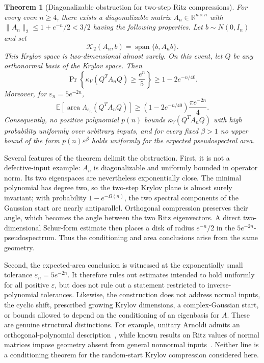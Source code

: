 \documentclass[11pt]{article}
\newtheorem{theorem}{Theorem}[section]
\begin{document}
\begin{theorem}[Diagonalizable obstruction for two-step Ritz compressions]
\label{thm:main}
For every even $n\geq4$, there exists a diagonalizable matrix
$A_n\in\mathbb R^{n\times n}$ with
$\lVert A_n\rVert_2\leq1+e^{-n}/2<3/2$ having the
following properties.  Let $b\sim N(0,I_n)$ and set
\[
  \mathcal K_2(A_n,b)=\operatorname{span}\{b,A_nb\}.
\]
This Krylov space is two-dimensional almost surely.  On this event, let $Q$
be any orthonormal basis of the Krylov space.  Then
\[
  \Pr\!\left\{\kappa_V(Q^TA_nQ)\geq \frac{e^n}{5}\right\}
  \geq 1-2e^{-n/40}.
\]
Moreover, for $\varepsilon_n=5e^{-2n}$,
\[
  \mathbb E\!\left[\operatorname{area}
  \Lambda_{\varepsilon_n}(Q^TA_nQ)\right]
  \geq \left(1-2e^{-n/40}\right)\frac{\pi e^{-2n}}4.
\]
Consequently, no positive polynomial $p(n)$ bounds $\kappa_V(Q^TA_nQ)$ with
high probability uniformly over arbitrary inputs, and for every fixed
$\beta>1$ no upper bound of the form $p(n)\varepsilon^\beta$ holds uniformly
for the expected pseudospectral area.
\end{theorem}

Several features of the theorem delimit the obstruction.  First, it is not a
defective-input example: $A_n$ is diagonalizable and uniformly bounded in
operator norm.  Its two eigenspaces are nevertheless exponentially close.
The minimal polynomial has degree two, so the two-step Krylov plane is almost
surely invariant; with probability $1-e^{-\Omega(n)}$, the two spectral
components of the Gaussian start are nearly antiparallel.  Orthogonal
compression preserves their angle, which becomes the angle between the two
Ritz eigenvectors.  A direct two-dimensional Schur-form estimate then places
a disk of radius $e^{-n}/2$ in the $5e^{-2n}$-pseudospectrum.  Thus the
conditioning and area conclusions arise from the same geometry.

Second, the expected-area conclusion is witnessed at the exponentially small
tolerance $\varepsilon_n=5e^{-2n}$.  It therefore rules out estimates intended
to hold uniformly for all positive $\varepsilon$, but does not rule out a
statement restricted to inverse-polynomial tolerances.  Likewise, the
construction does not address normal inputs, the cyclic shift, prescribed
growing Krylov dimensions, a complex-Gaussian start, or bounds allowed to
depend on the conditioning of an eigenbasis for $A$.  These are genuine
structural distinctions.  For example, unitary Arnoldi admits an
orthogonal-polynomial description~\cite{Gragg1993ArnoldiIsometric}, while
known results on Ritz values of normal matrices impose geometry absent from
general nonnormal inputs~\cite{CardenHansen2013NormalRitz}.  Neither line is a
conditioning theorem for the random-start Krylov compression considered
here.
\end{document}

